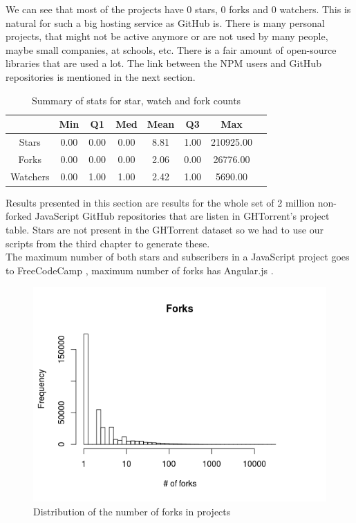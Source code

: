 \documentclass[thesis=M,english]{FITthesis}[2012/10/20]
\begin{document}
We can see that most of the projects have 0 stars, 0 forks and 0 watchers. This is natural for such a big hosting service as GitHub is. There is many personal projects, that might not be active anymore or are not used by many people, maybe small companies, at schools, etc. There is a fair amount of  open-source libraries that are used a lot. The link between the NPM users and GitHub repositories is mentioned in the next section.

\begin{table}[h!]
\centering
\begin{tabular}{@{}cccccccc@{}}
& Min & Q1 & Med & Mean & Q3 & Max &     \\ \midrule
Stars  & 0.00  & 0.00 & 0.00   & 8.81 & 1.00 &  210925.00 &\\
Forks  & 0.00   & 0.00  & 0.00 & 2.06 & 0.00 & 26776.00 & \\
Watchers  & 0.00  & 1.00 & 1.00   & 2.42 & 1.00 & 5690.00 & \\
\bottomrule
\end{tabular}
\caption{Summary of stats for star, watch and fork counts}
\label{gh_meta_popularity}
\end{table}


Results presented in this section are results for the whole set of 2 million non-forked JavaScript GitHub repositories that are listen in GHTorrent's project table. Stars are not present in the GHTorrent dataset so we had to use our scripts from the third chapter to generate these. \\

The maximum number of both stars and subscribers in a JavaScript project goes to FreeCodeCamp \cite{fcc}, maximum number of forks has Angular.js \cite{gh_angular}.

\begin{center}
\begin{figure}[ht]
	\includegraphics[totalheight=240pt]{images/meta_forks.png}
	\caption{Distribution of the number of forks in projects}
	\label{fig: meta_forks}
\end{figure}
\end{center}
\end{document}

